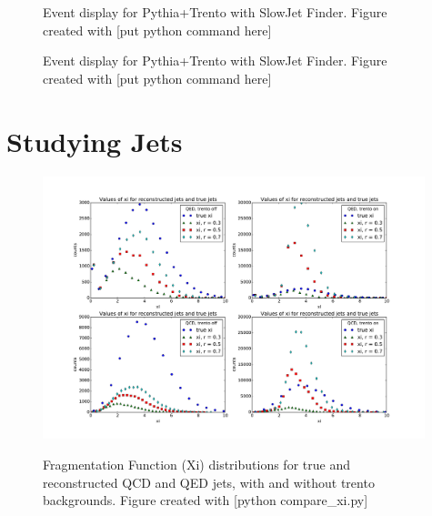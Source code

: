 \documentclass[11pt]{article}
\begin{document}
\begin{figure}[h]
\begin{center}
\label{fig_label}
\caption{Event display for Pythia+Trento with SlowJet Finder.  Figure created with [put python command here]}
\end{center}
\end{figure}

\begin{figure}[h]
\begin{center}
\label{fig_label}
\caption{Event display for Pythia+Trento with SlowJet Finder.  Figure created with [put python command here]}
\end{center}
\end{figure}

\section{Studying Jets}
%
%

\begin{figure}[h]
\begin{center}
\includegraphics[width=0.99\textwidth]{compare_xi.pdf}
\label{fig_label}
\caption{Fragmentation Function (Xi) distributions for true and reconstructed QCD and QED jets, with and without trento backgrounds.  Figure created with [python compare_xi.py]}
\end{center}
\end{figure}

%
%
\end{document}
